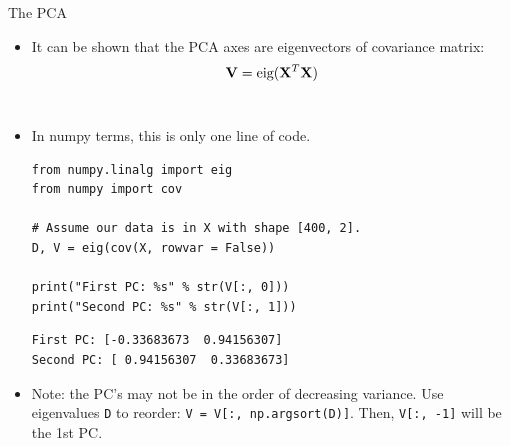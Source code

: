 \documentclass[10pt, aspectratio=169]{beamer} %
\begin{document}
\begin{frame}[fragile, allowframebreaks=0.8]{The PCA}
	    \begin{itemize}
			\item It can be shown that the PCA axes are eigenvectors of  covariance matrix:
			\[
			{\bf V} = \text{eig}({\bf X}^T{\bf X})
			\]
\end{itemize}
		\begin{columns}
	    \begin{itemize}
			\item In numpy terms, this is only one line of code.
\begin{lstlisting}
from numpy.linalg import eig
from numpy import cov

# Assume our data is in X with shape [400, 2].
D, V = eig(cov(X, rowvar = False))

print("First PC: %s" % str(V[:, 0]))
print("Second PC: %s" % str(V[:, 1]))   
\end{lstlisting}

\begin{lstlisting}
First PC: [-0.33683673  0.94156307]
Second PC: [ 0.94156307  0.33683673]
\end{lstlisting}
\item Note: the PC's may not be in the order of decreasing variance.
 Use eigenvalues \verb+D+ to reorder: 
\verb+V = V[:, np.argsort(D)]+. Then, \verb+V[:, -1]+ will be the 1st PC.
\end{itemize}
			

\end{columns}
\end{frame}
\end{document}
